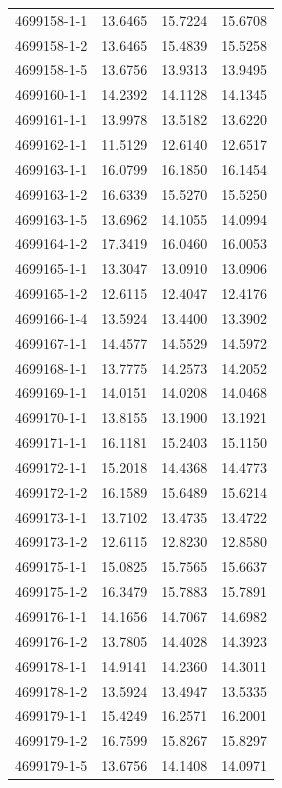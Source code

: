 \begin{longtable}{lrrr}
4699158-1-1 & 13.6465 & 15.7224 & 15.6708 \\
4699158-1-2 & 13.6465 & 15.4839 & 15.5258 \\
4699158-1-5 & 13.6756 & 13.9313 & 13.9495 \\
4699160-1-1 & 14.2392 & 14.1128 & 14.1345 \\
4699161-1-1 & 13.9978 & 13.5182 & 13.6220 \\
4699162-1-1 & 11.5129 & 12.6140 & 12.6517 \\
4699163-1-1 & 16.0799 & 16.1850 & 16.1454 \\
4699163-1-2 & 16.6339 & 15.5270 & 15.5250 \\
4699163-1-5 & 13.6962 & 14.1055 & 14.0994 \\
4699164-1-2 & 17.3419 & 16.0460 & 16.0053 \\
4699165-1-1 & 13.3047 & 13.0910 & 13.0906 \\
4699165-1-2 & 12.6115 & 12.4047 & 12.4176 \\
4699166-1-4 & 13.5924 & 13.4400 & 13.3902 \\
4699167-1-1 & 14.4577 & 14.5529 & 14.5972 \\
4699168-1-1 & 13.7775 & 14.2573 & 14.2052 \\
4699169-1-1 & 14.0151 & 14.0208 & 14.0468 \\
4699170-1-1 & 13.8155 & 13.1900 & 13.1921 \\
4699171-1-1 & 16.1181 & 15.2403 & 15.1150 \\
4699172-1-1 & 15.2018 & 14.4368 & 14.4773 \\
4699172-1-2 & 16.1589 & 15.6489 & 15.6214 \\
4699173-1-1 & 13.7102 & 13.4735 & 13.4722 \\
4699173-1-2 & 12.6115 & 12.8230 & 12.8580 \\
4699175-1-1 & 15.0825 & 15.7565 & 15.6637 \\
4699175-1-2 & 16.3479 & 15.7883 & 15.7891 \\
4699176-1-1 & 14.1656 & 14.7067 & 14.6982 \\
4699176-1-2 & 13.7805 & 14.4028 & 14.3923 \\
4699178-1-1 & 14.9141 & 14.2360 & 14.3011 \\
4699178-1-2 & 13.5924 & 13.4947 & 13.5335 \\
4699179-1-1 & 15.4249 & 16.2571 & 16.2001 \\
4699179-1-2 & 16.7599 & 15.8267 & 15.8297 \\
4699179-1-5 & 13.6756 & 14.1408 & 14.0971 \\

\end{longtable}

